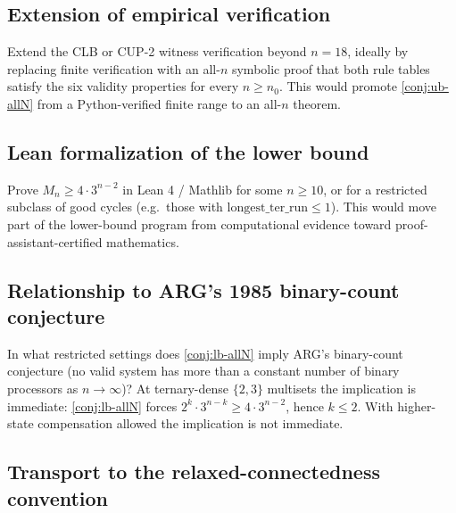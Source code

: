 \documentclass[11pt,a4paper]{article}
\theoremstyle{plain}
\theoremstyle{definition}
\newcommand{\Mn}{M_n}
\begin{document}
\subsection{Extension of empirical verification}\label{sec:open-extend}

Extend the CLB or CUP-2 witness verification beyond $n = 18$, ideally
by replacing finite verification with an all-$n$ symbolic proof that
both rule tables satisfy the six validity properties for every
$n \ge n_0$.
This would promote \cref{conj:ub-allN} from a Python-verified finite
range to an all-$n$ theorem.

\subsection{Lean formalization of the lower bound}\label{sec:open-leanlb}

Prove $\Mn \ge 4 \cdot 3^{n-2}$ in Lean 4 / Mathlib for some $n \ge 10$,
or for a restricted subclass of good cycles (e.g.\ those with
$\mathrm{longest\_ter\_run} \le 1$).  This would move part of the
lower-bound program from computational evidence toward
proof-assistant-certified mathematics.

\subsection{Relationship to ARG's 1985 binary-count conjecture}\label{sec:open-arg}

In what restricted settings does \cref{conj:lb-allN} imply ARG's
binary-count conjecture (no valid system has more than a constant
number of binary processors as $n \to \infty$)?  At ternary-dense
$\{2, 3\}$ multisets the implication is immediate: \cref{conj:lb-allN}
forces $2^k \cdot 3^{n-k} \ge 4 \cdot 3^{n-2}$, hence $k \le 2$.
With higher-state compensation allowed the implication is not
immediate.

\subsection{Transport to the relaxed-connectedness convention}\label{sec:open-relaxed-vs-connected}
\end{document}
